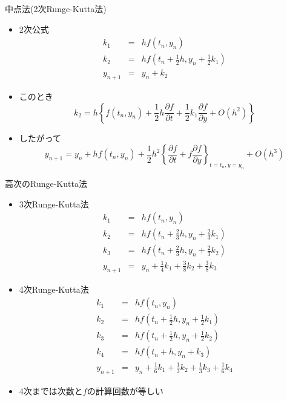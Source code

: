 \documentclass[dvipdfmx]{beamer}
\begin{document}
\begin{frame}[t,fragile]{中点法(2次Runge-Kutta法)}
  \begin{itemize}
  \item 2次公式
    \[
    \begin{array}{rcl}
      k_1 & = & h f(t_n, y_n) \\
      k_2 & = & h f(t_n + \frac{1}{2}h, y_n + \frac{1}{2}k_1) \\
      y_{n+1} & = & y_n + k_2
    \end{array}
    \]
  \item このとき
    \[
    k_2 = h 
    \left\{
    f(t_n, y_n)
    + \frac{1}{2}h \frac{\partial f}{\partial t}
    + \frac{1}{2}k_1 \frac{\partial f}{\partial y}
    + O(h^2)
    \right\}
    \]
  \item したがって
    \[
    y_{n+1} = y_n + h f(t_n, y_n) + \frac{1}{2}h^2
    \left\{
    \frac{\partial f}{\partial t}
    + f \frac{\partial f}{\partial y}
    \right\}_{t=t_n, y=y_n}
    \!\!\!\!\!\!\!\!\!\!\!\!+ O(h^3)
    \]
  \end{itemize}
\end{frame}

\begin{frame}[t,fragile]{高次のRunge-Kutta法}
  \begin{itemize}
  \item 3次Runge-Kutta法
    \[
    \begin{array}{rcl}
      k_1 & = & h f(t_n, y_n) \\
      k_2 & = & h f(t_n + \frac{2}{3}h, y_n + \frac{2}{3}k_1) \\
      k_3 & = & h f(t_n + \frac{2}{3}h, y_n + \frac{2}{3}k_2) \\
      y_{n+1} & = & y_n + \frac{1}{4}k_1 + \frac{3}{8}k_2
      + \frac{3}{8}k_3
    \end{array}
    \]
  \item 4次Runge-Kutta法
    \[
    \begin{array}{rcl}
      k_1 & = & h f(t_n, y_n) \\
      k_2 & = & h f(t_n + \frac{1}{2}h, y_n + \frac{1}{2}k_1) \\
      k_3 & = & h f(t_n + \frac{1}{2}h, y_n + \frac{1}{2}k_2) \\
      k_4 & = & h f(t_n + h, y_n + k_3) \\
      y_{n+1} & = & y_n + \frac{1}{6}k_1 + \frac{1}{3}k_2
      + \frac{1}{3}k_3 + \frac{1}{6}k_4
    \end{array}
    \]
  \item 4次までは次数と$f$の計算回数が等しい
  \end{itemize}
\end{frame}
\end{document}
